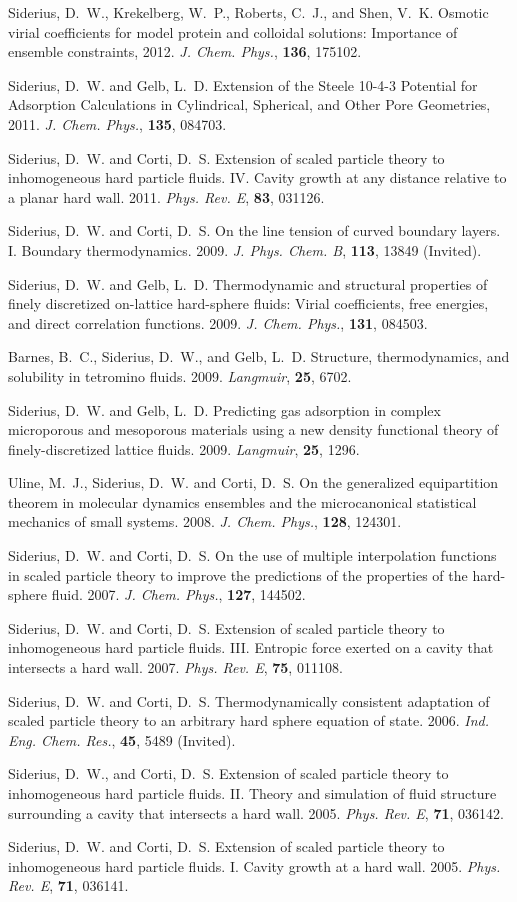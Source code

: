 Siderius, D.~W., Krekelberg, W.~P., Roberts, C.~J., and Shen, V.~K. Osmotic virial coefficients for model protein and colloidal solutions: Importance of ensemble constraints, 2012. {\it J. Chem. Phys.}, {\bf 136}, 175102.

Siderius, D.~W. and Gelb, L.~D. Extension of the Steele 10-4-3 Potential for Adsorption Calculations in Cylindrical, Spherical, and Other Pore Geometries, 2011. {\it J. Chem. Phys.}, {\bf 135}, 084703.

Siderius, D.~W. and Corti, D.~S. Extension of scaled particle theory to inhomogeneous hard particle fluids. IV. Cavity growth at any distance relative to a planar hard wall. 2011. {\it Phys. Rev. E}, {\bf 83}, 031126.

Siderius, D.~W. and Corti, D.~S. On the line tension of curved boundary layers. I. Boundary thermodynamics. 2009. {\it J. Phys. Chem. B}, {\bf 113}, 13849 (Invited).

Siderius, D.~W. and Gelb, L.~D. Thermodynamic and structural properties of finely discretized on-lattice hard-sphere fluids: Virial coefficients, free energies, and direct correlation functions. 2009. {\it J. Chem. Phys.}, {\bf 131}, 084503.

Barnes, B.~C., Siderius, D.~W., and Gelb, L.~D. Structure, thermodynamics, and solubility in tetromino fluids. 2009. {\it Langmuir}, {\bf 25}, 6702.

Siderius, D.~W. and Gelb, L.~D. Predicting gas adsorption in complex microporous and mesoporous materials using a new density functional theory of finely-discretized lattice fluids. 2009. {\it Langmuir}, {\bf 25}, 1296.

Uline, M.~J., Siderius, D.~W. and Corti, D.~S. On the generalized equipartition theorem in molecular dynamics ensembles and the microcanonical statistical mechanics of small systems. 2008. {\it J. Chem. Phys.}, {\bf 128}, 124301.

Siderius, D.~W. and Corti, D.~S. On the use of multiple interpolation functions in scaled particle theory to improve the predictions of the properties of the hard-sphere fluid. 2007. {\it J. Chem. Phys.}, {\bf 127}, 144502.

Siderius, D.~W. and Corti, D.~S. Extension of scaled particle theory to inhomogeneous hard particle fluids. III. Entropic force exerted on a cavity that intersects a hard wall. 2007. {\it Phys. Rev. E}, {\bf 75}, 011108.

Siderius, D.~W. and Corti, D.~S. Thermodynamically consistent adaptation of scaled particle theory to an arbitrary hard sphere equation of state. 2006. {\it Ind. Eng. Chem. Res.}, {\bf 45}, 5489 (Invited).

Siderius, D.~W., and Corti, D.~S. Extension of scaled particle theory to inhomogeneous hard particle fluids. II. Theory and simulation of fluid structure surrounding a cavity that intersects a hard wall. 2005. {\it Phys. Rev. E}, {\bf 71}, 036142.

Siderius, D.~W. and Corti, D.~S. Extension of scaled particle theory to inhomogeneous hard particle fluids. I. Cavity growth at a hard wall. 2005. {\it Phys. Rev. E}, {\bf 71}, 036141.
